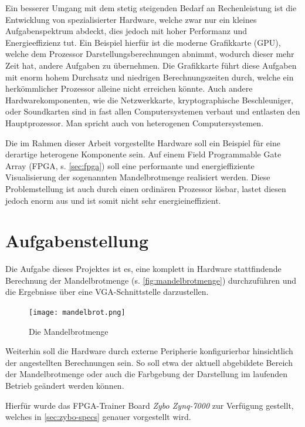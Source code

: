 \documentclass[a4paper,12pt,onesided]{report}
\begin{document}
Ein besserer Umgang mit dem stetig steigenden Bedarf an Rechenleistung ist die Entwicklung von spezialisierter Hardware, welche zwar nur ein kleines Aufgabenspektrum abdeckt, dies jedoch mit hoher Performanz und Energieeffizienz tut.
Ein Beispiel hierfür ist die moderne Grafikkarte (GPU), welche dem Prozessor Darstellungsberechnungen abnimmt, wodurch dieser mehr Zeit hat, andere Aufgaben zu übernehmen. Die Grafikkarte führt diese Aufgaben mit enorm hohem Durchsatz und niedrigen Berechnungszeiten durch, welche ein herkömmlicher Prozessor alleine nicht erreichen könnte.
Auch andere Hardwarekomponenten, wie die Netzwerkkarte, kryptographische Beschleuniger, oder Soundkarten sind in fast allen Computersystemen verbaut und entlasten den Hauptprozessor. Man spricht auch von heterogenen Computersystemen.

Die im Rahmen dieser Arbeit vorgestellte Hardware soll ein Beispiel für eine derartige heterogene Komponente sein. Auf einem Field Programmable Gate Array (FPGA, s. \autoref{sec:fpga}) soll eine performante und energieffiziente Visualisierung der sogenannten Mandelbrotmenge realisiert werden.
Diese Problemstellung ist auch durch einen ordinären Prozessor lösbar, lastet diesen jedoch enorm aus und ist somit nicht sehr energieineffizient.

\section{Aufgabenstellung}
\label{sec:aufgabenstellung}
Die Aufgabe dieses Projektes ist es, eine komplett in Hardware stattfindende Berechnung der Mandelbrotmenge (s. \autoref{fig:mandelbrotmenge}) durchzuführen und die Ergebnisse über eine VGA-Schnittstelle darzustellen.

\begin{figure}[H]
	\centering
	\texttt{[image: mandelbrot.png]}
	\caption{Die Mandelbrotmenge}
	\label{fig:mandelbrotmenge}
\end{figure}

Weiterhin soll die Hardware durch externe Peripherie konfigurierbar hinsichtlich der angestellten Berechnungen sein.
So soll etwa der aktuell abgebildete Bereich der Mandelbrotmenge oder auch die Farbgebung der Darstellung im laufenden Betrieb geändert werden können.

Hierfür wurde das FPGA-Trainer Board \textit{Zybo Zynq-7000} zur Verfügung gestellt, welches in \autoref{sec:zybo-specs} genauer vorgestellt wird.

\end{document}
